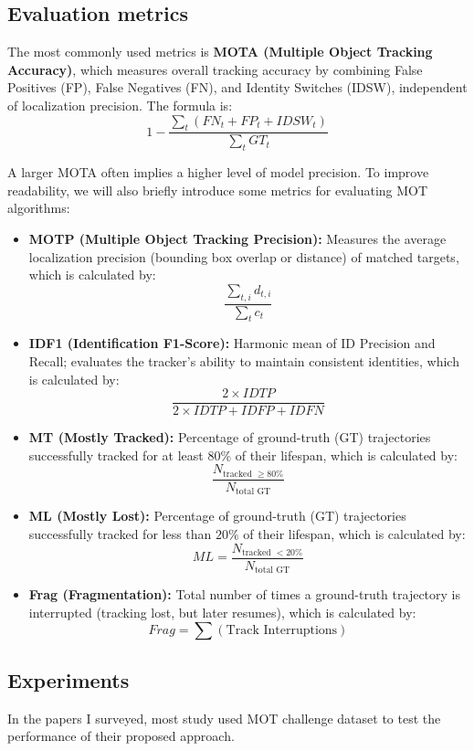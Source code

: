 \documentclass[10pt,twocolumn,letterpaper]{article}
\begin{document}
\subsection{Evaluation metrics}
The most commonly used metrics is \textbf{MOTA (Multiple Object Tracking Accuracy)}, which measures overall tracking accuracy by combining False Positives (FP), False Negatives (FN), and Identity Switches (IDSW), independent of localization precision. The formula is:
$$\displaystyle 1 - \frac{\sum_t (FN_t + FP_t + IDSW_t)}{\sum_t GT_t}$$

A larger MOTA often implies a higher level of model precision. To improve readability, we will also briefly introduce some metrics for evaluating MOT algorithms:
\begin{itemize}    
    \item \textbf{MOTP (Multiple Object Tracking Precision):} Measures the average localization precision (bounding box overlap or distance) of matched targets, which is calculated by:
    $$\displaystyle \frac{\sum_{t,i} d_{t,i}}{\sum_t c_t}$$
    
    \item \textbf{IDF1 (Identification F1-Score):} Harmonic mean of ID Precision and Recall; evaluates the tracker's ability to maintain consistent identities, which is calculated by:
    $$\displaystyle \frac{2 \times IDTP}{2 \times IDTP + IDFP + IDFN}$$
    
    \item \textbf{MT (Mostly Tracked):} Percentage of ground-truth (GT) trajectories successfully tracked for at least $80\%$ of their lifespan, which is calculated by:
    $$\displaystyle \frac{N_{\text{tracked } \ge 80\%}}{N_{\text{total GT}}}$$
    
    \item \textbf{ML (Mostly Lost):} Percentage of ground-truth (GT) trajectories successfully tracked for less than $20\%$ of their lifespan, which is calculated by:
    $$ML=\displaystyle \frac{N_{\text{tracked } < 20\%}}{N_{\text{total GT}}}$$
    
    \item \textbf{Frag (Fragmentation):} Total number of times a ground-truth trajectory is interrupted (tracking lost, but later resumes), which is calculated by:
    $$Frag=\displaystyle \sum (\text{Track Interruptions})$$
\end{itemize}
\subsection{Experiments}
In the papers I surveyed, most study used MOT challenge dataset to test the performance of their proposed approach.
\end{document}
